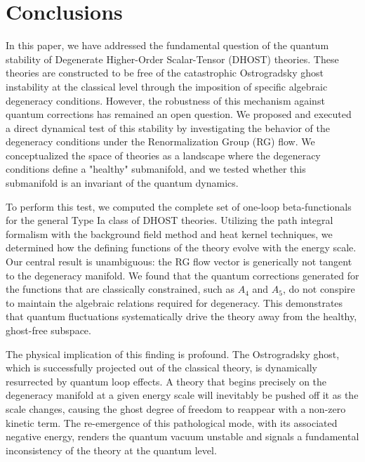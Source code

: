 \documentclass[twocolumn]{aastex631}
\begin{document}
\section{Conclusions}
\label{sec:conclusions}
In this paper, we have addressed the fundamental question of the quantum stability of Degenerate Higher-Order Scalar-Tensor (DHOST) theories. These theories are constructed to be free of the catastrophic Ostrogradsky ghost instability at the classical level through the imposition of specific algebraic degeneracy conditions. However, the robustness of this mechanism against quantum corrections has remained an open question. We proposed and executed a direct dynamical test of this stability by investigating the behavior of the degeneracy conditions under the Renormalization Group (RG) flow. We conceptualized the space of theories as a landscape where the degeneracy conditions define a "healthy" submanifold, and we tested whether this submanifold is an invariant of the quantum dynamics.

To perform this test, we computed the complete set of one-loop beta-functionals for the general Type Ia class of DHOST theories. Utilizing the path integral formalism with the background field method and heat kernel techniques, we determined how the defining functions of the theory evolve with the energy scale. Our central result is unambiguous: the RG flow vector is generically not tangent to the degeneracy manifold. We found that the quantum corrections generated for the functions that are classically constrained, such as $A_4$ and $A_5$, do not conspire to maintain the algebraic relations required for degeneracy. This demonstrates that quantum fluctuations systematically drive the theory away from the healthy, ghost-free subspace.

The physical implication of this finding is profound. The Ostrogradsky ghost, which is successfully projected out of the classical theory, is dynamically resurrected by quantum loop effects. A theory that begins precisely on the degeneracy manifold at a given energy scale will inevitably be pushed off it as the scale changes, causing the ghost degree of freedom to reappear with a non-zero kinetic term. The re-emergence of this pathological mode, with its associated negative energy, renders the quantum vacuum unstable and signals a fundamental inconsistency of the theory at the quantum level.
\end{document}
